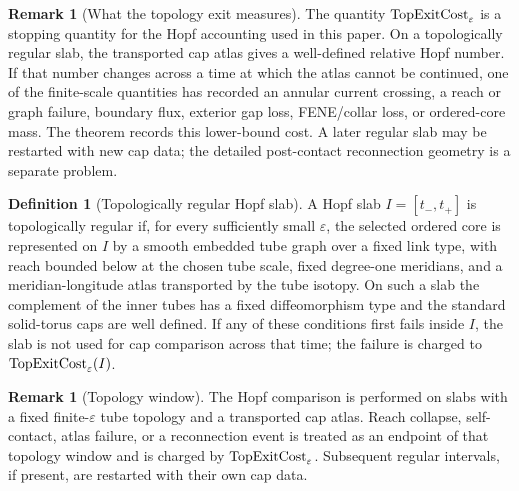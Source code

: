 \documentclass[11pt]{article}
\theoremstyle{definition}
\newtheorem{definition}[theorem]{Definition}
\newtheorem{remark}[theorem]{Remark}
\newcommand{\eps}{\varepsilon}
\begin{document}
\begin{remark}[What the topology exit measures]
The quantity \({\rm TopExitCost}_\eps\) is a stopping quantity for the Hopf
accounting used in this paper.  On a topologically regular slab, the transported
cap atlas gives a well-defined relative Hopf number.  If that number changes
across a time at which the atlas cannot be continued, one of the finite-scale
quantities has recorded an annular current crossing, a reach or graph failure,
boundary flux, exterior gap loss, FENE/collar loss, or ordered-core mass.  The
theorem records this lower-bound cost.  A later regular slab may be restarted
with new cap data; the detailed post-contact reconnection geometry is a separate
problem.
\end{remark}

\begin{definition}[Topologically regular Hopf slab]
\label{def:topological-regular-slab}
A Hopf slab \(I=[t_-,t_+]\) is topologically regular if, for every sufficiently
small \(\eps\), the selected ordered core is represented on \(I\) by a smooth
embedded tube graph over a fixed link type, with reach bounded below at the
chosen tube scale, fixed degree-one meridians, and a meridian-longitude atlas
transported by the tube isotopy.  On such a slab the complement of the inner
tubes has a fixed diffeomorphism type and the standard solid-torus caps are
well defined.  If any of these conditions first fails inside \(I\), the slab is
not used for cap comparison across that time; the failure is charged to
\({\rm TopExitCost}_\eps(I)\).
\end{definition}

\begin{remark}[Topology window]
The Hopf comparison is performed on slabs with a fixed finite-\(\eps\) tube
topology and a transported cap atlas.  Reach collapse, self-contact, atlas
failure, or a reconnection event is treated as an endpoint of that topology
window and is charged by \({\rm TopExitCost}_\eps\).  Subsequent regular
intervals, if present, are restarted with their own cap data.
\end{remark}
\end{document}
